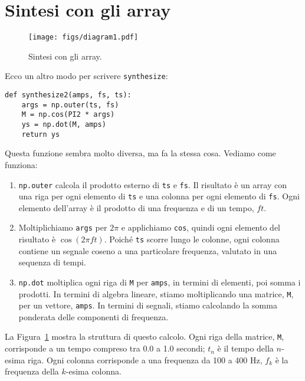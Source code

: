 \documentclass[12pt,a4paper]{book}
\begin{document}
\section{Sintesi con gli array} \label{synthesis} 

\begin{figure} \centerline{\texttt{[image: figs/diagram1.pdf]}} \caption{Sintesi con gli array.} \label{fig.synthesis} \end{figure} 

Ecco un altro modo per scrivere {\tt synthesize}:

\begin{verbatim} 
def synthesize2(amps, fs, ts):
    args = np.outer(ts, fs)
    M = np.cos(PI2 * args)
    ys = np.dot(M, amps)
    return ys
 \end{verbatim} 

Questa funzione sembra molto diversa, ma fa la stessa cosa. Vediamo come funziona:

\begin{enumerate} 

\item {\tt np.outer} calcola il prodotto esterno di {\tt ts} e {\tt fs}. Il risultato è un array con una riga per ogni elemento di {\tt ts} e una colonna per ogni elemento di {\tt fs}. Ogni elemento dell'array è il prodotto di una frequenza e di un tempo, $f t$.

\item Moltiplichiamo {\tt args} per $2 \pi$ e applichiamo {\tt cos}, quindi ogni elemento del risultato è $\cos (2 \pi f t)$. Poiché {\tt ts} scorre lungo le colonne, ogni colonna contiene un segnale coseno a una particolare frequenza, valutato in una sequenza di tempi.

\item {\tt np.dot} moltiplica ogni riga di {\tt M} per {\tt amps}, in termini di elementi, poi somma i prodotti. In termini di algebra lineare, stiamo moltiplicando una matrice, {\tt M}, per un vettore, {\tt amps}. In termini di segnali, stiamo calcolando la somma ponderata delle componenti di frequenza.

\end{enumerate} 

La Figura~\ref{fig.synthesis} mostra la struttura di questo calcolo. Ogni riga della matrice, {\tt M}, corrisponde a un tempo compreso tra 0.0 a 1.0 secondi; $t_n$ è il tempo della $n$-esima riga. Ogni colonna corrisponde a una frequenza da 100 a 400 Hz, $f_k$ è la frequenza della $k$-esima colonna.
\end{document}
